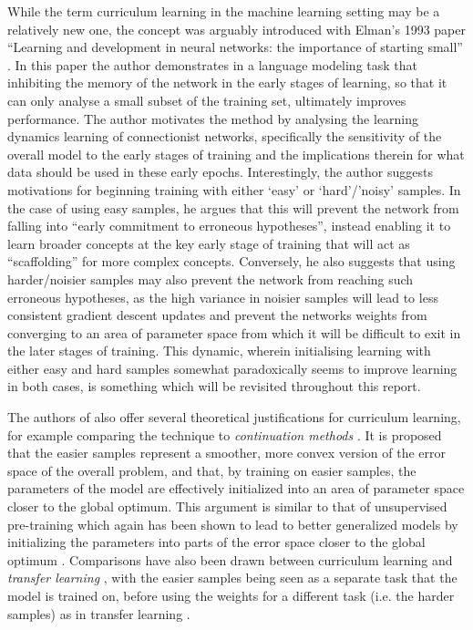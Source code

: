 While the term curriculum learning in the machine learning setting may be a relatively new one, the concept was arguably introduced with Elman's 1993 paper ``Learning and development in neural networks: the importance of starting small'' \cite{ELMAN199371}. In this paper the author demonstrates in a language modeling task that inhibiting the memory of the network in the early stages of learning, so that it can only analyse a small subset of the training set, ultimately improves performance. The author motivates the method by analysing the learning dynamics learning of connectionist networks, specifically the sensitivity of the overall model to the early stages of training and the implications therein for what data should be used in these early epochs. Interestingly, the author suggests motivations for beginning training with either `easy' or `hard'/'noisy' samples. In the case of using easy samples, he argues that this will prevent the network from falling into ``early commitment to erroneous hypotheses'', instead enabling it to learn broader concepts at the key early stage of training that will act as ``scaffolding'' for more complex concepts.  Conversely, he also suggests that using harder/noisier samples may also prevent the network from reaching such erroneous hypotheses, as the high variance in noisier samples will lead to less consistent gradient descent updates and prevent the networks weights from converging to an area of parameter space from which it will be difficult to exit in the later stages of training. This dynamic, wherein initialising learning with either easy and hard samples somewhat paradoxically seems to improve learning in both cases, is something which will be revisited throughout this report.

The authors of \cite{Bengio2009} also offer several theoretical justifications for curriculum learning, for example comparing the technique to \textit{continuation methods} \cite{Allgoer1980}. It is proposed that the easier samples represent a smoother, more convex version of the error space of the overall problem, and that, by training on easier samples, the parameters of the model are effectively initialized into an area of parameter space closer to the global optimum. This argument is similar to that of unsupervised pre-training \cite{erhan2009difficulty} which again has been shown to lead to better generalized models by initializing the parameters into parts of the error space closer to the global optimum \cite{bengio2012practical}. Comparisons have also been drawn between curriculum learning and \textit{transfer learning} \cite{pan2010survey}, with the easier samples being seen as a separate task that the model is trained on, before using the weights for a different task (i.e. the harder samples) as in transfer learning \cite{weinshall2018curriculum}.  

